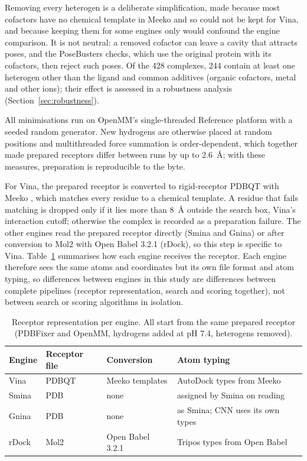 Removing every heterogen is a deliberate simplification, made because most cofactors have
no chemical template in Meeko and so could not be kept for Vina, and because keeping them for
some engines only would confound the engine comparison. It is not neutral: a removed
cofactor can leave a cavity that attracts poses, and the PoseBusters checks, which use the
original protein with its cofactors, then reject such poses. Of the 428 complexes, 244
contain at least one heterogen other than the ligand and common additives (organic
cofactors, metal and other ions); their effect is assessed in a robustness analysis
(Section~\ref{sec:robustness}).

All minimisations run on OpenMM's single-threaded Reference platform with a seeded random
generator. New hydrogens are otherwise placed at random positions and multithreaded force
summation is order-dependent, which together made prepared receptors differ between runs by
up to \SI{2.6}{\angstrom}; with these measures, preparation is reproducible to the byte.

For Vina, the prepared receptor is converted to rigid-receptor PDBQT with Meeko
\citep{meeko}, which matches every residue to a chemical template. A residue that fails
matching is dropped only if it lies more than \SI{8}{\angstrom} outside the search box,
Vina's interaction cutoff; otherwise the complex is recorded as a preparation failure. The
other engines read the prepared receptor directly (Smina and Gnina) or after conversion to
Mol2 with Open Babel 3.2.1 \citep{oboyle2011openbabel} (rDock), so this step is specific to
Vina. Table~\ref{tab:receptor-paths} summarises how each engine receives the receptor. Each
engine therefore sees the same atoms and coordinates but its own file format and atom
typing, so differences between engines in this study are differences between complete
pipelines (receptor representation, search and scoring together), not between search or
scoring algorithms in isolation.

\begin{table}[h]
  \centering
  \caption{Receptor representation per engine. All start from the same prepared receptor
    (PDBFixer and OpenMM, hydrogens added at pH 7.4, heterogens removed).}
  \label{tab:receptor-paths}
  \small
  \begin{tabular}{llll}
    \toprule
    Engine & Receptor file & Conversion & Atom typing \\
    \midrule
    Vina & PDBQT & Meeko templates & AutoDock types from Meeko \\
    Smina & PDB & none & assigned by Smina on reading \\
    Gnina & PDB & none & as Smina; CNN uses its own types \\
    rDock & Mol2 & Open Babel 3.2.1 & Tripos types from Open Babel \\
    \bottomrule
  \end{tabular}
\end{table}

